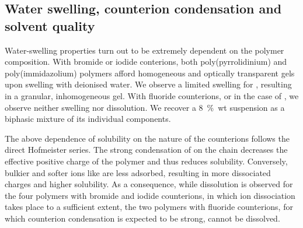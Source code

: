 \documentclass[journal=jacsat,manuscript=article]{achemso}
\begin{document}
\subsection{Water swelling, counterion condensation and solvent quality}
Water-swelling properties turn out to be extremely dependent on the polymer composition. With bromide or iodide conterions, both poly(pyrrolidinium) and poly(immidazolium) polymers afford homogeneous and optically transparent gels upon swelling with deionised water. We observe a limited swelling for , resulting in a granular, inhomogeneous gel. With fluoride counterions, or in the case of , we observe neither swelling nor dissolution. We recover a 8~\%~wt suspension as a biphasic mixture of its individual components.

The above dependence of solubility on the nature of the counterions follows the direct Hofmeister series. The strong condensation of  on the chain decreases the effective positive charge of the polymer and thus reduces solubility. Conversely, bulkier and softer ions like  are less adsorbed, resulting in more dissociated charges and higher solubility. As a consequence, while dissolution is observed for the four polymers with bromide and iodide counterions, in which ion dissociation takes place to a sufficient extent, the two polymers with fluoride counterions, for which counterion condensation is expected to be strong, cannot be dissolved.
\end{document}
